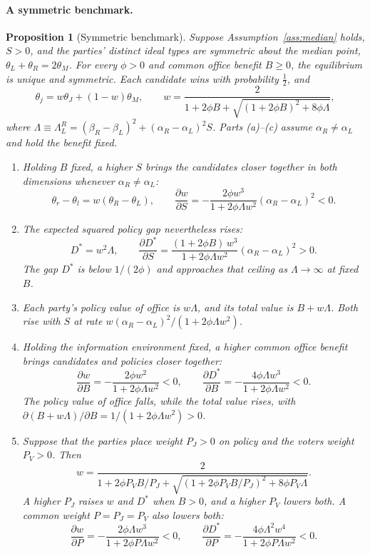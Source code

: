 \documentclass[12pt,letterpaper]{article}
\newtheorem{proposition}{Proposition}
\begin{document}
\paragraph{A symmetric benchmark.}

\begin{proposition}[Symmetric benchmark]\label{prop:symmetric}
Suppose Assumption~\ref{ass:median} holds, $S>0$, and the parties' distinct ideal types are symmetric about the median point, $\theta_L+\theta_R=2\theta_M$. For every $\phi>0$ and common office benefit $B\ge0$, the equilibrium is unique and symmetric. Each candidate wins with probability $\tfrac12$, and
\[
\theta_j=w\theta_J+(1-w)\theta_M,
\qquad
w=\frac{2}{1+2\phi B+\sqrt{(1+2\phi B)^2+8\phi\Lambda}},
\]
where $\Lambda\equiv\Lambda_L^R=(\beta_R-\beta_L)^2+(\alpha_R-\alpha_L)^2S$. Parts (a)--(c) assume $\alpha_R\ne\alpha_L$ and hold the benefit fixed.
\begin{enumerate}
  \item[(a)] Holding $B$ fixed, a higher $S$ brings the candidates closer together in both dimensions whenever $\alpha_R\ne\alpha_L$:
  \[
  \theta_r-\theta_l=w(\theta_R-\theta_L),
  \qquad
  \frac{\partial w}{\partial S}=-\frac{2\phi w^3}{1+2\phi\Lambda w^2}(\alpha_R-\alpha_L)^2<0.
  \]
  \item[(b)] The expected squared policy gap nevertheless rises:
  \[
  D^*=w^2\Lambda,
  \qquad
  \frac{\partial D^*}{\partial S}=\frac{(1+2\phi B)\,w^3}{1+2\phi\Lambda w^2}(\alpha_R-\alpha_L)^2>0.
  \]
  The gap $D^*$ is below $1/(2\phi)$ and approaches that ceiling as $\Lambda\to\infty$ at fixed $B$.
  \item[(c)] Each party's policy value of office is $w\Lambda$, and its total value is $B+w\Lambda$. Both rise with $S$ at rate $w(\alpha_R-\alpha_L)^2/(1+2\phi\Lambda w^2)$.
  \item[(d)] Holding the information environment fixed, a higher common office benefit brings candidates and policies closer together:
  \[
  \frac{\partial w}{\partial B}=-\frac{2\phi w^2}{1+2\phi\Lambda w^2}<0,
  \qquad
  \frac{\partial D^*}{\partial B}=-\frac{4\phi\Lambda w^3}{1+2\phi\Lambda w^2}<0.
  \]
  The policy value of office falls, while the total value rises, with $\partial(B+w\Lambda)/\partial B=1/(1+2\phi\Lambda w^2)>0$.
  \item[(e)] Suppose that the parties place weight $P_J>0$ on policy and the voters weight $P_V>0$. Then
  \[
  w=\frac{2}{1+2\phi P_VB/P_J+\sqrt{(1+2\phi P_VB/P_J)^2+8\phi P_V\Lambda}}.
  \]
  A higher $P_J$ raises $w$ and $D^*$ when $B>0$, and a higher $P_V$ lowers both. A common weight $P=P_J=P_V$ also lowers both:
  \[
  \frac{\partial w}{\partial P}=-\frac{2\phi\Lambda w^3}{1+2\phi P\Lambda w^2}<0,
  \qquad
  \frac{\partial D^*}{\partial P}=-\frac{4\phi\Lambda^2w^4}{1+2\phi P\Lambda w^2}<0.
  \]
\end{enumerate}
\end{proposition}
\end{document}
